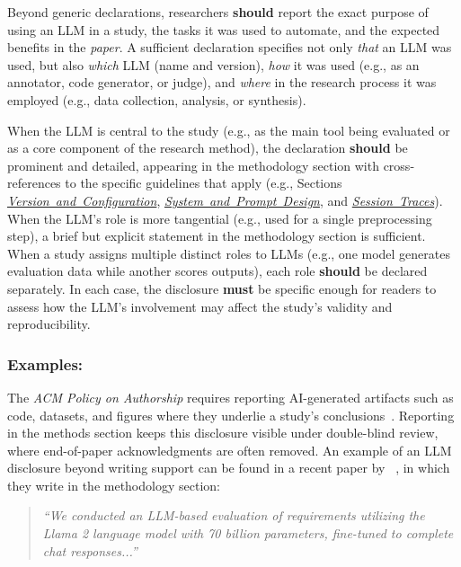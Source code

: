\documentclass[smallextended]{svjour3}
\newcommand{\must}{\textbf{must}\xspace}
\newcommand{\should}{\textbf{should}\xspace}
\newcommand{\paper}{\emph{paper}\xspace}
\newcommand{\paper}{\emph{paper}\xspace}
\newcommand{\modelversion}{\hyperref[sec:report-model-version-configuration-and-customizations]{\mbox{\emph{Version and Configuration}}}\xspace}
\newcommand{\design}{\hyperref[sec:report-system-and-prompt-design]{\mbox{\emph{System and Prompt Design}}}\xspace}
\newcommand{\traces}{\hyperref[sec:report-session-traces]{\mbox{\emph{Session Traces}}}\xspace}
\newcommand{\modelversion}{\href{/guidelines/model-version/}{\emph{Version and Configuration}}\xspace}
\newcommand{\design}{\href{/guidelines/design/}{\emph{System and Prompt Design}}\xspace}
\newcommand{\traces}{\href{/guidelines/traces/}{\emph{Session Traces}}\xspace}
\newcommand{\guidelinesubsubsection}[1]{\subsubsection{\bfseries #1:}}
\newcommand{\guidelinesubsubsection}[1]{\subsubsection{#1}}
\begin{document}
Beyond generic declarations, researchers \should report the exact purpose of using an LLM in a study, the tasks it was used to automate, and the expected benefits in the \paper.
A sufficient declaration specifies not only \emph{that} an LLM was used, but also \emph{which} LLM (name and version), \emph{how} it was used (e.g., as an annotator, code generator, or judge), and \emph{where} in the research process it was employed (e.g., data collection, analysis, or synthesis).

When the LLM is central to the study (e.g., as the main tool being evaluated or as a core component of the research method), the declaration \should be prominent and detailed, appearing in the methodology section with cross-references to the specific guidelines that apply (e.g., Sections \modelversion, \design, and \traces).
When the LLM's role is more tangential (e.g., used for a single preprocessing step), a brief but explicit statement in the methodology section is sufficient.
When a study assigns multiple distinct roles to LLMs (e.g., one model generates evaluation data while another scores outputs), each role \should be declared separately.
In each case, the disclosure \must be specific enough for readers to assess how the LLM's involvement may affect the study's validity and reproducibility.

\guidelinesubsubsection{Examples}

The \emph{ACM Policy on Authorship} requires reporting AI-generated artifacts such as code, datasets, and figures where they underlie a study's conclusions~\cite{ACM2026}.
Reporting in the methods section keeps this disclosure visible under double-blind review, where end-of-paper acknowledgments are often removed.
An example of an LLM disclosure beyond writing support can be found in a recent paper by \citeauthor{DBLP:conf/re/LubosFTGMEL24}~\cite{DBLP:conf/re/LubosFTGMEL24}, in which they write in the methodology section:

\begin{quote}
\it
``We conducted an LLM-based evaluation of requirements utilizing the Llama 2 language model with 70 billion parameters, fine-tuned to complete chat responses...''
\end{quote}
\end{document}
